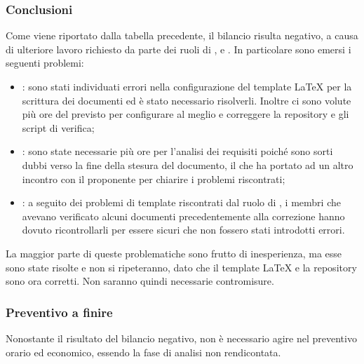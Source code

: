 \subsubsection{Conclusioni}
Come viene riportato dalla tabella precedente, il bilancio risulta negativo, a causa di ulteriore lavoro richiesto da parte dei ruoli di \ammProg{}, \analProg{} e \verifProg{}. In particolare sono emersi i seguenti problemi:
\begin{itemize}
\item \textbf{\ammProg{}}: sono stati individuati errori nella configurazione del template \LaTeX {} per la scrittura dei documenti ed è stato necessario risolverli. Inoltre ci sono volute più ore del previsto per configurare al meglio e correggere la repository e gli script di verifica;
\item \textbf{\analProg{}}: sono state necessarie più ore per l'analisi dei requisiti poiché sono sorti dubbi verso la fine della stesura del documento, il che ha portato ad un altro incontro con il proponente per chiarire i problemi riscontrati;
\item \textbf{\verifProg{}}: a seguito dei problemi di template riscontrati dal ruolo di \ammProg{}, i membri che avevano verificato alcuni documenti precedentemente alla correzione hanno dovuto ricontrollarli per essere sicuri che non fossero stati introdotti errori.
\end{itemize}

La maggior parte di queste problematiche sono frutto di inesperienza, ma esse sono state risolte e non si ripeteranno, dato che il template \LaTeX {} e la repository sono ora corretti. Non saranno quindi necessarie contromisure.

\subsubsection{Preventivo a finire}
Nonostante il risultato del bilancio negativo, non è necessario agire nel preventivo orario ed economico, essendo la fase di analisi non rendicontata.

